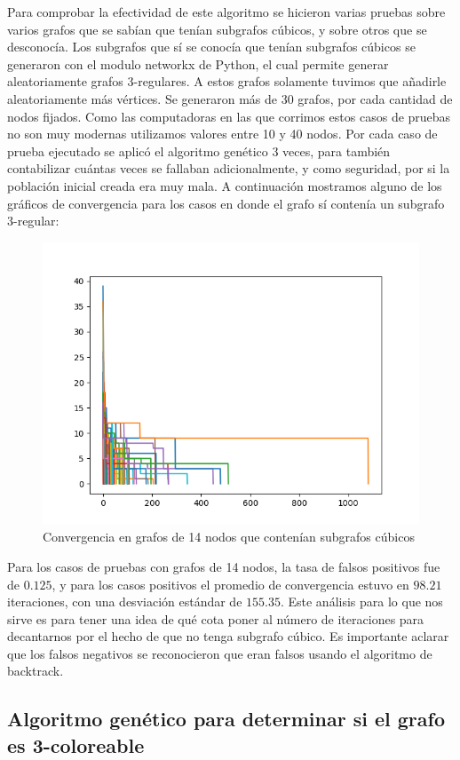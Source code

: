 \documentclass{article}
\begin{document}
Para comprobar la efectividad de este algoritmo se hicieron varias pruebas sobre varios grafos que se sabían que tenían subgrafos cúbicos, y sobre otros que se desconocía. Los subgrafos que sí se conocía que tenían subgrafos cúbicos se generaron con el modulo networkx de Python, el cual permite generar aleatoriamente grafos 3-regulares. A estos grafos solamente tuvimos que añadirle aleatoriamente más vértices. Se generaron más de 30 grafos, por cada cantidad de nodos fijados. Como las computadoras en las que corrimos estos casos de pruebas no son muy modernas utilizamos valores entre 10 y 40 nodos. Por cada caso de prueba ejecutado se aplicó el algoritmo genético 3 veces, para también contabilizar cuántas veces se fallaban adicionalmente, y como seguridad, por si la población inicial creada era muy mala. A continuación mostramos alguno de los gráficos de convergencia para los casos en donde el grafo sí contenía un subgrafo 3-regular:

\begin{figure}
	\centering
	\includegraphics[width=0.7\linewidth]{converge_14.png}
	\caption{Convergencia en grafos de 14 nodos que contenían subgrafos cúbicos}
\end{figure}


Para los casos de pruebas con grafos de 14 nodos, la tasa de falsos positivos fue de $0.125$, y para los casos positivos el promedio de convergencia estuvo en $98.21$ iteraciones, con una desviación estándar de $155.35$. Este análisis para lo que nos sirve es para tener una idea de qué cota poner al número de iteraciones para decantarnos por el hecho de que no tenga subgrafo cúbico. Es importante aclarar que los falsos negativos se reconocieron que eran falsos usando el algoritmo de backtrack.

\subsection*{Algoritmo gen\'etico para determinar si el grafo es 3-coloreable}
\end{document}
